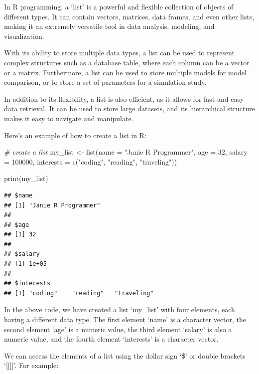 \documentclass[
]{book}
\newenvironment{Shaded}{\begin{snugshade}}{\end{snugshade}}
\newcommand{\AttributeTok}[1]{\textcolor[rgb]{0.77,0.63,0.00}{#1}}
\newcommand{\CommentTok}[1]{\textcolor[rgb]{0.56,0.35,0.01}{\textit{#1}}}
\newcommand{\DecValTok}[1]{\textcolor[rgb]{0.00,0.00,0.81}{#1}}
\newcommand{\FunctionTok}[1]{\textcolor[rgb]{0.00,0.00,0.00}{#1}}
\newcommand{\NormalTok}[1]{#1}
\newcommand{\OtherTok}[1]{\textcolor[rgb]{0.56,0.35,0.01}{#1}}
\newcommand{\StringTok}[1]{\textcolor[rgb]{0.31,0.60,0.02}{#1}}
\begin{document}
In R programming, a `list' is a powerful and flexible collection of objects of different types. It can contain vectors, matrices, data frames, and even other lists, making it an extremely versatile tool in data analysis, modeling, and visualization.

With its ability to store multiple data types, a list can be used to represent complex structures such as a database table, where each column can be a vector or a matrix. Furthermore, a list can be used to store multiple models for model comparison, or to store a set of parameters for a simulation study.

In addition to its flexibility, a list is also efficient, as it allows for fast and easy data retrieval. It can be used to store large datasets, and its hierarchical structure makes it easy to navigate and manipulate.

Here's an example of how to create a list in R:

\begin{Shaded}
\begin{Highlighting}[]
\CommentTok{\# create a list}
\NormalTok{my\_list }\OtherTok{\textless{}{-}} \FunctionTok{list}\NormalTok{(}\AttributeTok{name =} \StringTok{"Janie R Programmer"}\NormalTok{,}
                \AttributeTok{age =} \DecValTok{32}\NormalTok{,}
                \AttributeTok{salary =} \DecValTok{100000}\NormalTok{,}
                \AttributeTok{interests =} \FunctionTok{c}\NormalTok{(}\StringTok{"coding"}\NormalTok{, }\StringTok{"reading"}\NormalTok{, }\StringTok{"traveling"}\NormalTok{))}

\FunctionTok{print}\NormalTok{(my\_list)}
\end{Highlighting}
\end{Shaded}

\begin{verbatim}
## $name
## [1] "Janie R Programmer"
## 
## $age
## [1] 32
## 
## $salary
## [1] 1e+05
## 
## $interests
## [1] "coding"    "reading"   "traveling"
\end{verbatim}

In the above code, we have created a list `my\_list' with four elements, each having a different data type. The first element `name' is a character vector, the second element `age' is a numeric value, the third element `salary' is also a numeric value, and the fourth element `interests' is a character vector.

We can access the elements of a list using the dollar sign `\$' or double brackets `{[}{[}{]}{]}'. For example:
\end{document}
